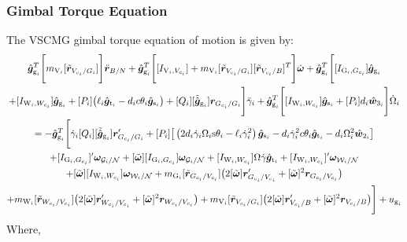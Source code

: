 \subsubsection{Gimbal Torque Equation}
The VSCMG gimbal torque equation of motion is given by:
\begin{multline}
\hat{\bm g}_{\text{g}_i}^T \Bigg[ m_{\text{V}_i}[\tilde{\bm r}_{V_{c_i}/G_i}] \Bigg] \ddot{\bm r}_{B/N}
+ \hat{\bm g}_{\text{g}_i}^T \Bigg[ [I_{\text{V}_i,V_{c_i}}] + m_{\text{V}_i}[\tilde{\bm r}_{V_{c_i}/G_i}][\tilde{\bm{r}}_{V_{c_i}/B}]^T \Bigg] \dot{\bm{\omega}}
+ \hat{\bm g}_{\text{g}_i}^T \Bigg[ [I_{\text{G}_i,G_{c_i}}]\hat{\bm{g}}_{\text{g}_i} 
\\+ [I_{\text{W}_i,W_{c_i}}]\hat{\bm{g}}_{\text{g}_i} + [P_i] \big(\ell_i\hat{\bm{g}}_{\text{t}_i} - d_ic\theta_i\hat{\bm{g}}_{\text{s}_i}\big) + [Q_i] [\tilde{\hat{\bm g}}_{\text{g}_i}]\bm{r}_{G_{c_i}/G_i} \Bigg] \ddot{\gamma}_i
+ \hat{\bm g}_{\text{g}_i}^T \Bigg[ [I_{\text{W}_i,W_{c_i}}]\hat{\bm{g}}_{\text{s}_i} + [P_i] d_i\hat{\bm w}_{3_i} \Bigg] \dot{\Omega}_i
\\ = - \hat{\bm g}_{\text{g}_i}^T \Bigg[ \dot{\gamma}_i[Q_i][\tilde{\hat{\bm g}}_{\text{g}_i}]\bm{r}'_{G_{c_i}/G_i} + [P_i] \big[\left(2d_i\dot{\gamma}_i\Omega_i\text{s}\theta_i - \ell_i\dot{\gamma}_i^2\right)\hat{\bm{g}}_{\text{s}_i} - d_i\dot{\gamma}_i^2c\theta_i\hat{\bm{g}}_{\text{t}_i} - d_i\Omega_i^2 \hat{\bm{w}}_{2_i}\big]
\\+[I_{\text{G}_i,G_{c_i}}]'\bm\omega_{\mathcal{G}_i/\cal N} + [\tilde{\bm\omega}][I_{\text{G}_i,G_{c_i}}]\bm\omega_{\mathcal{G}_i/\cal N} + [I_{\text{W}_i,W_{c_i}}]\Omega\dot{\gamma}\hat{\bm{g}}_{\text{t}_i} + [I_{\text{W}_i,W_{c_i}}]'\bm\omega_{\mathcal{W}_i/\cal N} \\+ [\tilde{\bm{\omega}}][I_{\text{W}_i,W_{c_i}}]\bm\omega_{\mathcal{W}_i/\cal N}
+ m_{\text{G}_i}[\tilde{\bm{r}}_{G_{c_i}/V_{c_i}}] \big( 2[\tilde{\bm\omega}]\bm{r}'_{G_{c_i}/V_{c_i}} + [\tilde{\bm\omega}]^2\bm{r}_{G_{c_i}/V_{c_i}}\big)
\\ + m_{\text{W}_i}[\tilde{\bm{r}}_{W_{c_i}/V_{c_i}}]\big( 2[\tilde{\bm\omega}]\bm{r}'_{W_{c_i}/V_{c_i}} + [\tilde{\bm\omega}]^2\bm{r}_{W_{c_i}/V_{c_i}}\big)
+ m_{\text{V}_i}[\tilde{\bm r}_{V_{c_i}/G_i}]\big( 2[\tilde{\bm\omega}]\bm{r}'_{V_{c_i}/B} + [\tilde{\bm\omega}]^2\bm{r}_{V_{c_i}/B} \big) \Bigg] + u_{\text{g}_i}
\label{eq:vscmgtorque}
\end{multline} 
Where,
